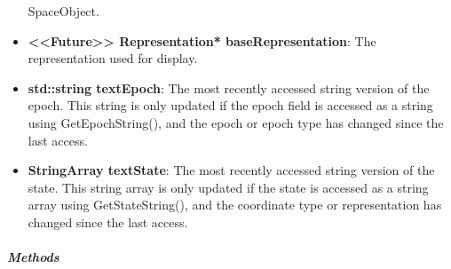 \begin{itemize}
SpaceObject.
\item \textbf{<<Future>> Representation* baseRepresentation}:  The representation used for display.
\item \textbf{std::string textEpoch}: The most recently accessed string version of the epoch.  This
string is only updated if the epoch field is accessed as a string using GetEpochString(), and the
epoch or epoch type has changed since the last access.
\item \textbf{StringArray textState}: The most recently accessed string version of the state.  This
string array is only updated if the state is accessed as a string array using GetStateString(), and
the coordinate type or representation has changed since the last access.
\end{itemize}

\subparagraph{\textit{Methods}}

